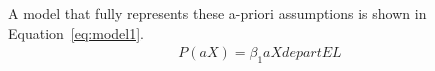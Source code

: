 A model that fully represents these a-priori assumptions is shown in Equation~\ref{eq:model1}.
\begin{align}
    P(aX) = \beta_1aXdepartEL
\end{align}
